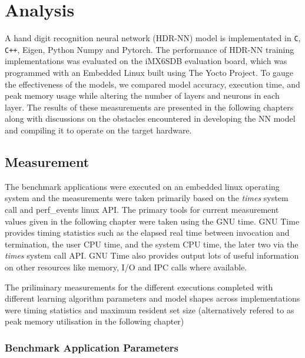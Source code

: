 \part{Analysis}

A hand digit recognition neural network (HDR-NN) model is implementated in \verb!C!, \verb!C++!, Eigen, Python Numpy and Pytorch. The performance of HDR-NN training implementations was evaluated on the iMX6SDB evaluation board, which was programmed with an Embedded Linux built using The Yocto Project. To gauge the effectiveness of the models, we compared model accuracy, execution time, and peak memory usage while altering the number of layers and neurons in each layer. The results of these measurements are presented in the following chapters along with discussions on the obstacles encountered in developing the NN model and compiling it to operate on the target hardware.


\chapter{Measurement}

The benchmark applications were executed on an embedded linux operating system and the measurements were taken primarily based on the \textit{times} system call and perf\_events linux API. The primary tools for current measurement values given in the following chapter were taken using the GNU time. GNU Time provides timing statistics such as the elapsed real time between invocation and termination, the user CPU time, and the system CPU time, the later two via the \textit{times} system call API. GNU Time also provides output lots of useful information on other resources like memory, I/O and IPC calls where available.

The priliminary measurements for the different executions completed with different learning algorithm parameters and model shapes across implementations were timing statistics and maximum resident set size (alternatively refered to as peak memory utilisation in the following chapter)

\section{Benchmark Application Parameters}


